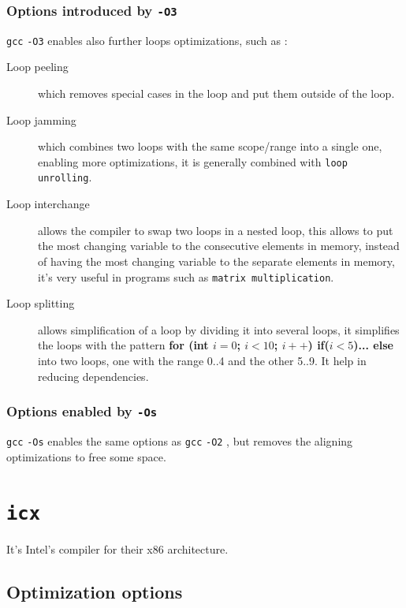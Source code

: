 \documentclass{rapport}
\newcommand{\gcc}{\texttt{gcc} }
\newcommand{\icx}{\texttt{icx} }
\newcommand{\optitwo}{\texttt{-O2} }
\newcommand{\optithree}{\texttt{-O3} }
\newcommand{\optisize}{\texttt{-Os} }
\begin{document}
\subsubsection{Options introduced by \optithree}
\gcc \optithree enables also further loops optimizations, such as :

\begin{description}
    \item[Loop peeling] which removes special cases in the loop and put them outside of the loop.
    \item[Loop jamming] which combines two loops with the same scope/range into a single one, enabling more optimizations, it is generally combined with \texttt{loop unrolling}.
    \item[Loop interchange] allows the compiler to swap two loops in a nested loop, this allows to put the most changing variable to the consecutive elements in memory, instead of having the most changing variable to the separate elements in memory, it's very useful in programs such as \texttt{matrix multiplication}.
    \item[Loop splitting] allows simplification of a loop by dividing it into several loops, it simplifies the loops with the pattern \textbf{for (int $i=0$; $i<10$; $i++$) if($i<5$)... else} into two loops, one with the range 0..4 and the other 5..9. It help in reducing dependencies.
\end{description}

\subsubsection{Options enabled by \optisize}
\gcc \optisize enables the same options as \gcc \optitwo, but removes the aligning optimizations to free some space.






\section{\icx}
It's Intel's compiler for their x86 architecture.
\subsection{Optimization options}
\end{document}
